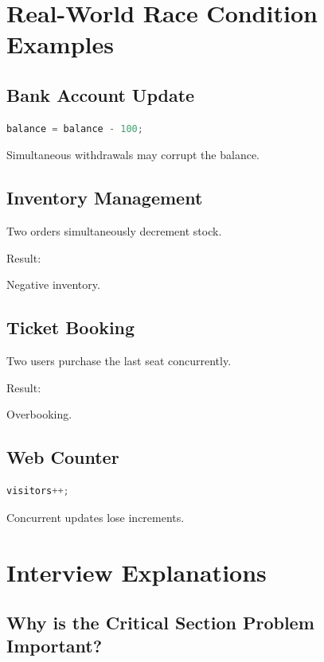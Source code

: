 \section{Real-World Race Condition Examples}

\subsection{Bank Account Update}

\begin{lstlisting}[language=C++,style=interviewcode]
balance = balance - 100;
\end{lstlisting}

Simultaneous withdrawals may corrupt the balance.

\subsection{Inventory Management}

Two orders simultaneously decrement stock.

Result:

Negative inventory.

\subsection{Ticket Booking}

Two users purchase the last seat concurrently.

Result:

Overbooking.

\subsection{Web Counter}

\begin{lstlisting}[language=C++,style=interviewcode]
visitors++;
\end{lstlisting}

Concurrent updates lose increments.

\section{Interview Explanations}

\subsection{Why is the Critical Section Problem Important?}

